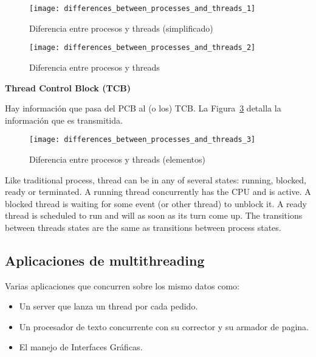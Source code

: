 \documentclass[a4paper, twoside]{article}
\begin{document}
\begin{figure}[h]
  \centering
  \texttt{[image: differences\_between\_processes\_and\_threads\_1]}
  \caption{Diferencia entre procesos y threads (simplificado)}
  \label{fig:differences_between_processes_and_threads_1}
\end{figure}

\begin{figure}[h]
  \centering
  \texttt{[image: differences\_between\_processes\_and\_threads\_2]}
  \caption{Diferencia entre procesos y threads}
  \label{fig:differences_between_processes_and_threads_2}
\end{figure}

\textbf{Thread Control Block (TCB)}

Hay información que pasa del PCB al (o los) TCB.
La Figura~\ref{fig:differences_between_processes_and_threads_3} detalla la
información que es transmitida.

\begin{figure}[h]
  \centering
  \texttt{[image: differences\_between\_processes\_and\_threads\_3]}
  \caption{Diferencia entre procesos y threads (elementos)}
  \label{fig:differences_between_processes_and_threads_3}
\end{figure}

Like traditional process, thread can be in any of several states:
running, blocked, ready or terminated.
A running thread concurrently has the CPU and is active.
A blocked thread is waiting for some event (or other thread) to unblock it.
A ready thread is scheduled to run and will as soon as its turn come up.
The transitions between threads states are the same as transitions between
process states.

\newpage
\subsection{Aplicaciones de multithreading}

Varias aplicaciones que concurren sobre los mismo datos como:
\begin{itemize}
  \item Un server que lanza un thread por cada pedido.
  \item Un procesador de texto concurrente con su corrector y su armador
  de pagina.
  \item El manejo de Interfaces Gráficas.
\end{itemize}
\end{document}
